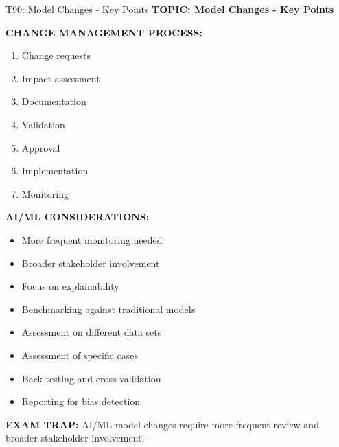 \documentclass[8pt]{beamer}
\begin{document}
	\begin{frame}{T90: Model Changes - Key Points}
		\fontsize{6.5}{7.5}\selectfont
		\textbf{TOPIC: Model Changes - Key Points}
		
		\vspace{0.1cm}
		\textbf{CHANGE MANAGEMENT PROCESS:}
		\begin{enumerate}
			\item Change requests
			\item Impact assessment
			\item Documentation
			\item Validation
			\item Approval
			\item Implementation
			\item Monitoring
		\end{enumerate}
		
		\vspace{0.1cm}
		\textbf{AI/ML CONSIDERATIONS:}
		\begin{itemize}
			\item More frequent monitoring needed
			\item Broader stakeholder involvement
			\item Focus on explainability
			\item Benchmarking against traditional models
			\item Assessment on different data sets
			\item Assessment of specific cases
			\item Back testing and cross-validation
			\item Reporting for bias detection
		\end{itemize}
		
		\textcolor{myred}{\textbf{EXAM TRAP:}} AI/ML model changes require \textcolor{myblue}{more frequent review and broader stakeholder involvement}!
	\end{frame}
	
\end{document}
